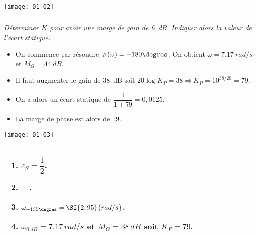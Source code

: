 \begin{multicols}{2}
\begin{corrige}
\begin{center}
\texttt{[image: 01\_02]}
\end{center}

\end{corrige}
\else
\fi


\subparagraph{}\textit{Déterminer $K$ pour avoir une marge de gain de \SI{6}{dB}. Indiquer alors la valeur de l'écart statique.}
\ifprof
\begin{corrige}
\begin{itemize}
\item On commence par résoudre $\varphi\left(\omega\right)=-180\degres$. On obtient $\omega=\SI{7,17}{rad/s}$ et $M_G=\SI{44}{dB}$.

\item Il faut augmenter le gain de \SI{38}{dB} soit $20\log K_P=38\Rightarrow K_P=10^{38/20}=79$.


\item On a alors un écart statique de $\dfrac{1}{1+79}=0,0125$.

\item La marge de phase est alors de 19\degres. 
\end{itemize}

\begin{center}
\texttt{[image: 01\_03]}
\end{center}

\end{corrige}
\else
\fi



\ifprof
\else
\ifcolle
\else

\noindent
\begin{tabular}{|p{.9\linewidth}|}
\hline
\begin{enumerate}
\item $\varepsilon_S=\dfrac{1}{2}$.
\item $\quad$.
\item $\omega_{-135\degres}=\SI{2,95}{rad/s}$.
\item $\omega_{\SI{0}{dB}}=\SI{7,17}{rad/s}$ et $M_G=\SI{38}{dB}$ soit $K_P=79$.
\end{enumerate} \\
\hline
\end{tabular}
\fi
\fi



\ifprof
\else
\begin{center}
\end{center}
\fi




\end{multicols}
